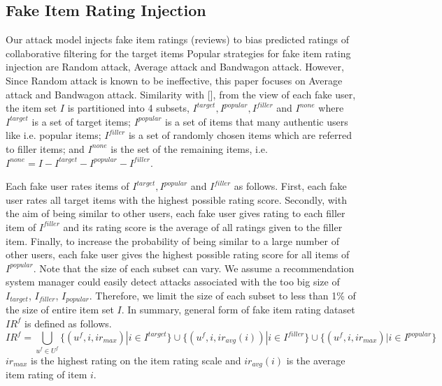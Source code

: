 \documentclass[master,english,final]{kaist-ucs}
\begin{document}
\subsection{Fake Item Rating Injection}
Our attack model injects fake item ratings (reviews) to bias predicted ratings of collaborative filtering for the target items
Popular strategies for fake item rating injection are Random attack, Average attack and Bandwagon attack.
However, Since Random attack is known to be ineffective, this paper focuses on Average attack and Bandwagon attack.
Similarity with [], from the view of each fake user, the item set $I$ is partitioned into 4 subsets, $I^{target},I^{popular},I^{filler}$  and $I^{none}$ where $I^{target}$ is a set of target items; $I^{popular}$ is a set of items that many authentic users like i.e. popular items; $I^{filler}$ is a set of randomly chosen items which are referred to filler items; and $I^{none}$ is the set of the remaining items, i.e. $I^{none}=I-I^{target}-I^{popular}-I^{filler}$.

Each fake user rates items of $I^{target},I^{popular}$ and $I^{filler}$ as follows.
First, each fake user rates all target items with the highest possible rating score.
Secondly, with the aim of being similar to other users, each fake user gives rating to each filler item of $I^{filler}$ and its rating score is the average of all ratings given to the filler item.
Finally, to increase the probability of being similar to a large number of other users, each fake user gives the highest possible rating score for all items of $I^{popular}$.
Note that the size of each subset can vary.
We assume a recommendation system manager could easily detect attacks associated with the too big size of $I_{target}$, $I_{filler}$, $I_{popular}$.
Therefore, we limit the size of each subset to less than 1\% of the size of entire item set $I$.
In summary, general form of fake item rating dataset $IR^f$ is defined as follows.
\begin{equation}
{IR}^f = \bigcup_{u^f \in U^f} \{(u^f,i,ir_{max}) | i \in I^{target} \} \cup \{(u^f,i,ir_{avg} {(i)}) | i \in I^{filler} \} \cup \{(u^f,i,ir_{max}) | i \in I^{popular} \}
\end{equation}
$ir_{max}$ is the highest rating on the item rating scale and $ir_{avg} {(i)}$ is the average item rating of item $i$.
\end{document}
